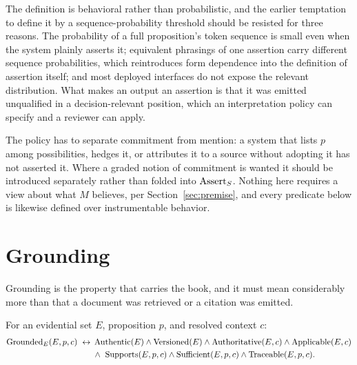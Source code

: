 The definition is behavioral rather than probabilistic, and the earlier temptation to
define it by a sequence-probability threshold should be resisted for three reasons. The
probability of a full proposition's token sequence is small even when the system plainly
asserts it; equivalent phrasings of one assertion carry different sequence probabilities,
which reintroduces form dependence into the
definition of assertion itself; and most deployed interfaces do not expose the relevant
distribution. What makes an output an assertion is that it was emitted unqualified in a
decision-relevant position, which an interpretation policy can specify and a reviewer can
apply.

The policy has to separate commitment from mention: a system that lists $p$ among
possibilities, hedges it, or attributes it to a source without adopting it has not asserted
it. Where a graded notion of commitment is wanted it should be introduced separately
rather than folded into $\operatorname{Assert}_S$. Nothing here requires a view about what
$M$ believes, per Section~\ref{sec:premise}, and every predicate below is likewise
defined over instrumentable behavior.

\section{Grounding}
\label{sec:grounding-def}

Grounding is the property that carries the book, and it must mean considerably
more than that a document was retrieved or a citation was emitted.

\begin{definition}
\label{def:grounded-evidence}
For an evidential set $E$, proposition $p$, and resolved context $c$:
\begin{equation}
  \begin{aligned}
  \operatorname{Grounded}_{E}(E, p, c) \;\leftrightarrow\;
    &\operatorname{Authentic}(E) \wedge \operatorname{Versioned}(E) \wedge \operatorname{Authoritative}(E, c)
      \wedge \operatorname{Applicable}(E, c)\\
    &\wedge\ \operatorname{Supports}(E, p, c) \wedge \operatorname{Sufficient}(E, p, c)
      \wedge \operatorname{Traceable}(E, p, c).
  \end{aligned}
  \label{eq:grounded}
\end{equation}
\end{definition}

